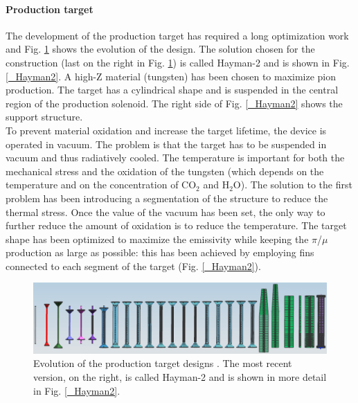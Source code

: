 \documentclass[12pt,a4paper,openright, oneside, titlepage]{book} %
\begin{document}
\paragraph{Production target}
The development of the production target has required a long optimization work and Fig.  \ref{_production_target_history} shows  the evolution of the design.
The solution chosen for the construction (last on the right in Fig.  \ref{_production_target_history}) is called Hayman-2 and is shown in Fig. \ref{_Hayman2}.
A high-Z material (tungsten) has been chosen to maximize pion production. 
The target has a cylindrical shape and is suspended in the central region of the production solenoid.
The right side of Fig. \ref{_Hayman2} shows the support structure.\\
To prevent material oxidation and increase the target lifetime, the device is operated in vacuum. 
The problem is that the target has to be suspended in vacuum and thus radiatively cooled.
The temperature is important for both the mechanical stress and the oxidation of the tungsten (which depends on the temperature and on the concentration of CO$_2$ and H$_2$O).
The solution to the first problem has been introducing a segmentation of the structure to reduce the thermal stress. 
Once the value of the vacuum has been set, the only way to further reduce the amount of oxidation is to reduce the temperature. 
The target shape has been optimized to maximize the emissivity while keeping the $\pi$/$\mu$ production as large as possible: this has been achieved by employing fins connected to each segment of the target (Fig. \ref{_Hayman2}).

\begin{figure}[h!]
\centering
\includegraphics[scale=0.5]{production_target_history}
\caption{Evolution of the production target designs \cite{Pushka_Hayman2}. 
The most recent version, on the right, is called Hayman-2 and is shown in more detail in Fig. \ref{_Hayman2}.}
\label{_production_target_history}
\end{figure}
\end{document}
